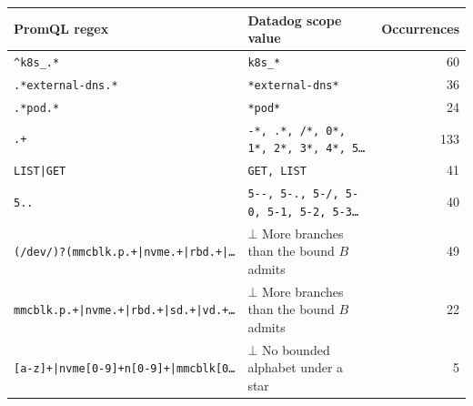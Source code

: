 \begin{tabular}{@{}llr@{}}
\toprule
PromQL regex & Datadog scope value & Occurrences \\
\midrule
\texttt{\textasciicircum{}k8s\_.*} & \texttt{k8s\_*} & 60 \\
\texttt{.*external-dns.*} & \texttt{*external-dns*} & 36 \\
\texttt{.*pod.*} & \texttt{*pod*} & 24 \\
\texttt{.+} & \texttt{-*, .*, /*, 0*, 1*, 2*, 3*, 4*, 5\dots{}} & 133 \\
\texttt{LIST|GET} & \texttt{GET, LIST} & 41 \\
\texttt{5..} & \texttt{5-{}-, 5-., 5-/, 5-0, 5-1, 5-2, 5-3\dots{}} & 40 \\
\texttt{(/dev/)?(mmcblk.p.+|nvme.+|rbd.+|\dots{}} & $\bot$ More branches than the bound $B$ admits & 49 \\
\texttt{mmcblk.p.+|nvme.+|rbd.+|sd.+|vd.+\dots{}} & $\bot$ More branches than the bound $B$ admits & 22 \\
\texttt{[a-z]+|nvme[0-9]+n[0-9]+|mmcblk[0\dots{}} & $\bot$ No bounded alphabet under a star & 5 \\
\bottomrule
\end{tabular}
